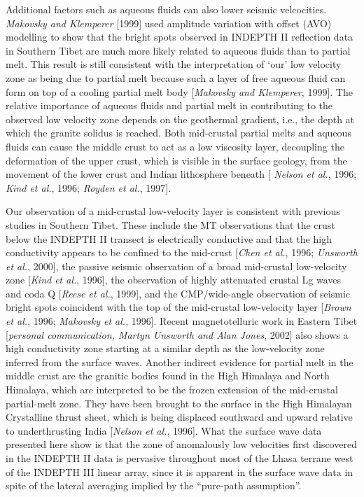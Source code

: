 \documentclass[12pt]{article}
\begin{document}
Additional factors such as aqueous fluids can also lower seismic velcocities.
{\it Makovsky and Klemperer} [1999] used amplitude variation with
offset (AVO) modelling to show that
the bright spots observed in INDEPTH II reflection data in
Southern Tibet are much more likely related to aqueous fluids than to
partial melt.  This result is still consistent with the
interpretation of `our' low velocity zone as being due to partial
melt because such a layer of free aqueous fluid can form on top of a
cooling partial melt body [{\it Makovsky and Klemperer}, 1999].  The
relative importance of aqueous fluids and partial melt in contributing
to the observed low velocity zone depends on the geothermal gradient,
i.e., the depth at which the granite solidus is reached.
Both mid-crustal partial melts and
aqueous fluids can cause the middle crust to act as a low viscosity
layer, decoupling the deformation of the upper
crust, which is visible in the surface geology, from the movement of
the lower crust and Indian lithosphere beneath [{\it
Nelson et al.}, 1996; {\it Kind et al.}, 1996; {\it Royden et al.}, 1997].

Our observation of a mid-crustal low-velocity layer is consistent with previous
studies in Southern Tibet.    These include the MT observations that the crust
below the INDEPTH II transect is electrically conductive and that the high conductivity appears to be
confined to the mid-crust [{\it Chen et al.}, 1996; {\it Unsworth et al.}, 2000], the passive seismic
observation of a broad mid-crustal low-velocity zone [{\it Kind et al.}, 1996], the observation of highly
attenuated crustal Lg waves and coda Q [{\it Reese et al.}, 1999], and the CMP/wide-angle observation of
seismic bright spots coincident with the top of the mid-crustal low-velocity layer [{\it Brown et al.},
1996; {\it Makovsky et al.}, 1996].  Recent magnetotelluric work in Eastern Tibet [{\it personal communication,
Martyn Unsworth and Alan Jones}, 2002] also shows a high conductivity zone starting at a similar depth as
the low-velocity zone inferred from the surface waves.
Another indirect evidence for partial melt in the
middle crust are the granitic bodies
found in the High Himalaya and North Himalaya, which are
interpreted to be the frozen extension of the mid-crustal partial-melt
zone. They have been brought to the surface  in the  High Himalayan Crystalline thrust
sheet, which is being displaced southward and upward relative to
underthrusting India [{\it Nelson et al.}, 1996].
What the
surface wave data presented here show is that the zone of anomalously
low velocities first discovered in the INDEPTH II data is
pervasive throughout most of the Lhasa terrane west of the INDEPTH III
linear array, since it is apparent in the surface wave data in spite
of the lateral averaging implied by the ``pure-path assumption''.
\end{document}
